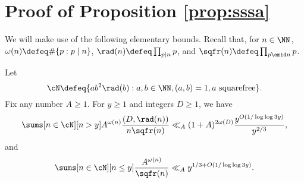 \documentclass[12pt, reqno, twoside, letterpaper]{amsart}
\begin{document}
\section{Proof of Proposition \ref{prop:sssa}}
 \label{sec:keyprop}

We will make use of the following elementary bounds.
%
Recall that, for $n \in \NN$, 
$\omega(n) \defeq \#\{p : p \mid n\}$, 
$\rad(n) \defeq \prod_{p \mid n} p$, and 
$\sqfr(n) \defeq \prod_{p \emid n} p$.
 
\begin{lemma} 
 \label{lem:omegabnd}
%
Let 
\begin{equation}
 \label{eq:defcN}
  \cN 
   \defeq 
    \{ab^2\rad(b) : a,b \in \NN, (a,b) = 1, a \text{ squarefree}\}.
\end{equation}
%
Fix any number $A \ge 1$.
%
For $y \ge 1$ and integers $D \ge 1$, we have 
\begin{equation}
 \label{eq:realbnd}
  \sums[n \in \cN][n > y]
   A^{\omega(n)}
    \frac{(D,\rad(n))}{n\sqfr(n)}
     \ll_A
      (1 + A)^{2\omega(D)}
       \frac{y^{O(1/\log\log 3y)}}{y^{2/3}},  
\end{equation}
and 
\begin{equation}
 \label{eq:realbnd2}
  \sums[n \in \cN][n \le y]
   \frac{A^{\omega(n)}}{\sqfr(n)}
    \ll_A
     y^{1/3 + O(1/\log\log 3y)}.
\end{equation}
\end{lemma}
\end{document}
